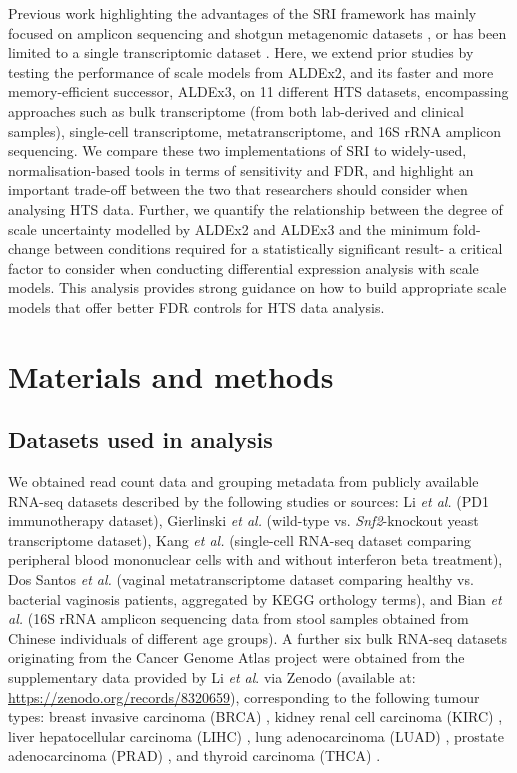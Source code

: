 \documentclass[10pt,letterpaper]{article}
\begin{document}
Previous work highlighting the advantages of the SRI framework has mainly focused on amplicon sequencing and shotgun metagenomic datasets \cite{konnaris_uncertainty_2025}, or has been limited to a single transcriptomic dataset \cite{gloor_explicit_2025}. Here, we extend prior studies by testing the performance of scale models from ALDEx2, and its faster and more memory-efficient successor, ALDEx3, on 11 different HTS datasets, encompassing approaches such as bulk transcriptome (from both lab-derived and clinical samples), single-cell transcriptome, metatranscriptome, and 16S rRNA amplicon sequencing. We compare these two implementations of SRI to widely-used, normalisation-based tools in terms of sensitivity and FDR, and highlight an important trade-off between the two that researchers should consider when analysing HTS data. Further, we quantify the relationship between the degree of scale uncertainty modelled by ALDEx2 and ALDEx3 and the minimum fold-change between conditions required for a statistically significant result- a critical factor to consider when conducting differential expression analysis with scale models. This analysis provides strong guidance on how to build appropriate scale models that offer better FDR controls for HTS data analysis.


\section*{Materials and methods}

\subsection*{Datasets used in analysis}
We obtained read count data and grouping metadata from publicly available RNA-seq datasets described by the following studies or sources: Li \textit{et al.} \cite{li_exaggerated_2022} (PD1 immunotherapy dataset), Gierlinski \textit{et al.} \cite{gierlinski_statistical_2015} (wild-type vs. \textit{Snf2}-knockout yeast transcriptome dataset), Kang \textit{et al.} \cite{kang_multiplexed_2018} (single-cell RNA-seq dataset comparing peripheral blood mononuclear cells with and without interferon beta treatment), Dos Santos \textit{et al.} \cite{dos_santos_vaginal_2024} (vaginal metatranscriptome dataset comparing healthy vs. bacterial vaginosis patients, aggregated by KEGG orthology terms), and Bian \textit{et al.} \cite{bian_gut_2017} (16S rRNA amplicon sequencing data from stool samples obtained from Chinese individuals of different age groups). A further six bulk RNA-seq datasets originating from the Cancer Genome Atlas project \cite{weinstein_cancer_2013} were obtained from the supplementary data provided by Li \textit{et al}. via Zenodo \cite{li_supplement_2022} (available at: \url{https://zenodo.org/records/8320659}), corresponding to the following tumour types: breast invasive carcinoma (BRCA) \cite{tcga_brca_2012,tcga_brca_2015}, kidney renal cell carcinoma (KIRC) \cite{tcga_kirc_2013}, liver hepatocellular carcinoma (LIHC) \cite{tcga_lihc_2017}, lung adenocarcinoma (LUAD) \cite{tcga_luad_2016}, prostate adenocarcinoma (PRAD) \cite{tcga_prad_2015}, and thyroid carcinoma (THCA) \cite{tcga_thca_2014}.
\end{document}
